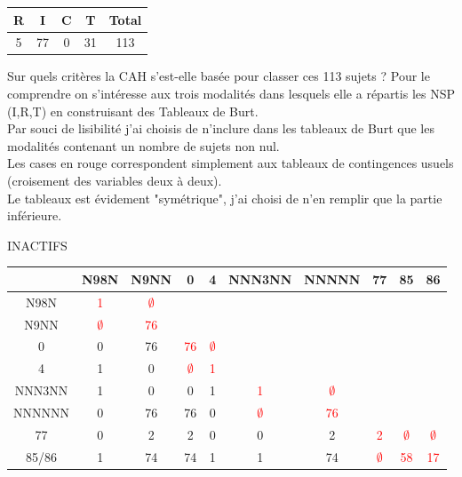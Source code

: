 \documentclass{book}
\begin{document}
\begin{center}
\setlength\arrayrulewidth{.5pt}
\begin{tabular}{|c|c|c|c||c|}
\hline
R & I & C & T & Total\\
\hline
5 & 77 & 0 & 31 & 113\\
\hline
\end{tabular}
\end{center}

\noindent
Sur quels critères la CAH s'est-elle basée pour classer ces 113 sujets ? 
Pour le comprendre on s'intéresse aux trois modalités dans lesquels elle a répartis les NSP (I,R,T) en construisant des Tableaux de Burt.\\

\noindent
Par souci de lisibilité j'ai choisis de n'inclure dans les tableaux de Burt que les modalités contenant un nombre de sujets non nul.\\
Les cases en rouge correspondent simplement aux tableaux de contingences usuels (croisement des variables deux à deux).\\
Le tableaux est évidement "symétrique", j'ai choisi de n'en remplir que la partie inférieure.\\


\begin{center} INACTIFS \end{center}

\begin{center}
\setlength\arrayrulewidth{.5pt}
\begin{tabular}{|c|cc||cc||cc||ccc|}
\hline
	& N98N & N9NN & 0 & 4 & NNN3NN & NNNNN & 77 & 85 & 86\\
\hline
\hline
N98N & \textcolor{red}{1} &\textcolor{red}{$\emptyset$} & & & & & & & \\
N9NN &\textcolor{red}{$\emptyset$} & \textcolor{red}{76} & & & & & & & \\
\hline
\hline
0 & 0 & 76 & \textcolor{red}{76} & \textcolor{red}{$\emptyset$}& & & & & \\
4 & 1 & 0 &\textcolor{red}{$\emptyset$} & \textcolor{red}{1} & & & & &  \\
\hline
\hline
NNN3NN & 1 & 0 & 0 & 1 &\textcolor{red}{1} &\textcolor{red}{$\emptyset$} & & &  \\
\hline
NNNNNN & 0 & 76 & 76 &0 &\textcolor{red}{$\emptyset$} & \textcolor{red}{76} & & &\\
\hline
\hline
77 & 0 & 2 & 2 & 0 & 0 &2 & \textcolor{red}{2} &\textcolor{red}{$\emptyset$} &\textcolor{red}{$\emptyset$} \\
85/86 & 1 &74 & 74 & 1 & 1 & 74 &\textcolor{red}{$\emptyset$} & \textcolor{red}{58} & \textcolor{red}{17}\\
\hline
\end{tabular}
\end{center}
\end{document}
